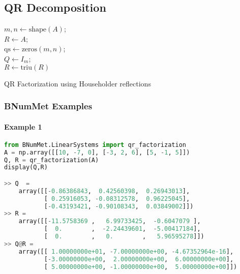 \subsection{QR Decomposition}
\begin{algorithm}[H]{
\SetAlgoLined
{}
$m, n \gets \text{shape}(A)$;\\
$R \gets A$;\\
$\text{qs} \gets \text{zeros}(m, n)$;\\
\For{$k \in [0, n)$}{
    $x \gets R_{k:, k}$;\\
    $q_k \gets \text{sign}(x_0) \times \text{norm}(x) \times I_{x, 1} + x$;\\
    $q_k \gets q_k / \text{norm}(q_k)$; \\
    $R_{k:, k:} \gets R_{k:, k:} - 2q_k(q_k^TR_{k:, k:})$ ;\\
}
$ Q \gets I_m $;\\
$R \gets \text{triu}(R)$\;
\;
}
\caption{QR Factorization using Householder reflections}
\end{algorithm}
\subsubsection{BNumMet Examples}
\paragraph{Example 1}{
\begin{lstlisting}[language=Python]
from BNumMet.LinearSystems import qr_factorization
A = np.array([[10, -7, 0], [-3, 2, 6], [5, -1, 5]])
Q, R = qr_factorization(A)
display(Q,R)

>> Q  = 
    array([[-0.86386843,  0.42560398,  0.26943013],
           [ 0.25916053, -0.08312578,  0.96225045],
           [-0.43193421, -0.90108343,  0.03849002]])
>> R = 
    array([[-11.5758369 ,   6.99733425,  -0.6047079 ],
           [  0.        ,  -2.24439601,  -5.00417184],
           [  0.        ,   0.        ,   5.96595278]])
>> Q@R = 
    array([[ 1.00000000e+01, -7.00000000e+00, -4.67352964e-16],
           [-3.00000000e+00,  2.00000000e+00,  6.00000000e+00],
           [ 5.00000000e+00, -1.00000000e+00,  5.00000000e+00]])
\end{lstlisting}
}

